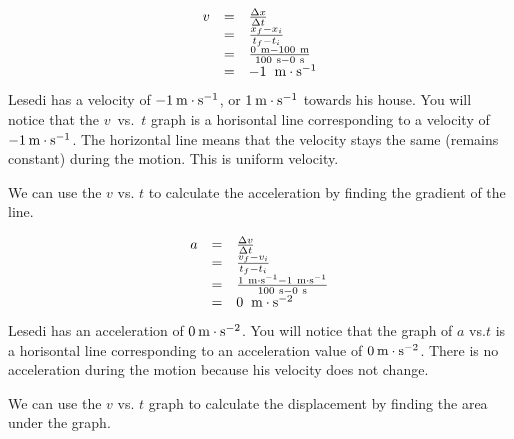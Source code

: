     \begin{equation*}
    \begin{array}{ccc}\hfill v& =& \frac{\Delta x}{\Delta t}\hfill \\ & =& \frac{{x}_{f}-{x}_{i}}{{t}_{f}-{t}_{i}}\hfill \\ & =& \frac{0\phantom{\rule{3.33333pt}{0ex}}\text{m}-100\phantom{\rule{3.33333pt}{0ex}}\text{m}}{100\phantom{\rule{3.33333pt}{0ex}}\text{s}-0\phantom{\rule{3.33333pt}{0ex}}\text{s}}\hfill \\ & =& -1\phantom{\rule{4pt}{0ex}}\phantom{\rule{0.166667em}{0ex}}\text{m}\ensuremath{\cdot}{\text{s}}^{-1}\hfill \end{array}
      \end{equation*}
        \label{m38795*id70472}Lesedi has a velocity of $-1\phantom{\rule{2pt}{0ex}}\text{m}\ensuremath{\cdot}\text{s}{}^{-1}$, or $1\phantom{\rule{2pt}{0ex}}\text{m}\ensuremath{\cdot}\text{s}{}^{-1}$ towards his house. You will notice that the $v$~vs.~$t$ graph is a horisontal line corresponding to a velocity of $-1\phantom{\rule{2pt}{0ex}}\text{m}\ensuremath{\cdot}\text{s}{}^{-1}$. The horizontal line means that the velocity stays the same (remains constant) during the motion. This is uniform velocity.\par 
        \label{m38795*id70573}We can use the $v$ vs. $t$ to calculate the acceleration by finding the gradient of the line.\par 
        \label{m38795*id70595}\nopagebreak\noindent{}
          
    \begin{equation*}
    \begin{array}{ccc}\hfill a& =& \frac{\Delta v}{\Delta t}\hfill \\ & =& \frac{{v}_{f}-{v}_{i}}{{t}_{f}-{t}_{i}}\hfill \\ & =& \frac{1\phantom{\rule{3.33333pt}{0ex}}\text{m}\ensuremath{\cdot}{\text{s}}^{-1}-1\phantom{\rule{3.33333pt}{0ex}}\text{m}\ensuremath{\cdot}{\text{s}}^{-1}}{100\phantom{\rule{3.33333pt}{0ex}}\text{s}-0\phantom{\rule{3.33333pt}{0ex}}\text{s}}\hfill \\ & =& 0\phantom{\rule{4pt}{0ex}}\phantom{\rule{0.166667em}{0ex}}\text{m}\ensuremath{\cdot}{\text{s}}^{-2}\hfill \end{array}
      \end{equation*}
        \label{m38795*id70807}Lesedi has an acceleration of $0\phantom{\rule{2pt}{0ex}}\text{m}\ensuremath{\cdot}\text{s}{}^{-2}$. You will notice that the graph of $a$ vs.$t$ is a horisontal line corresponding to an acceleration value of $0\phantom{\rule{2pt}{0ex}}\text{m}\ensuremath{\cdot}\text{s}{}^{-2}$. There is no acceleration during the motion because his velocity does not change.\par 
        \label{m38795*id70880}We can use the $v$ vs. $t$ graph to calculate the displacement by finding the area under the graph.\par 
        \label{m38795*id70902}\nopagebreak\noindent{}
          
